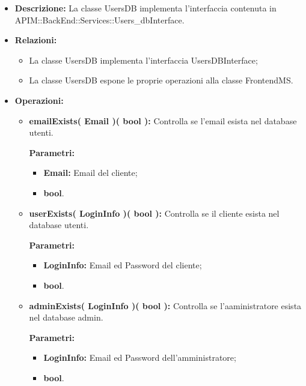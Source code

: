\begin{itemize}
	\item \textbf{Descrizione:} La classe UsersDB implementa l'interfaccia contenuta in APIM::BackEnd::Services::Users\_dbInterface.
	\item \textbf{Relazioni:}
		\begin{itemize}
			\item La classe UsersDB implementa l'interfaccia UsersDBInterface;
			\item La classe UsersDB espone le proprie operazioni alla classe FrontendMS.
		\end{itemize}
	\item \textbf{Operazioni:}
		\begin{itemize}
		
			\item \textbf{emailExists( Email )( bool ):} Controlla se l'email esista nel database utenti.
				\begin{description}
					\item[\textbf{Parametri:}]
				\end{description}
				\begin{itemize}
					\item \textbf{Email:} Email del cliente;
					\item \textbf{bool}.
				\end{itemize}
		
			\item \textbf{userExists( LoginInfo )( bool ):} Controlla se il cliente esista nel database utenti.
				\begin{description}
    				\item[\textbf{Parametri:}]
				\end{description}
				\begin{itemize}
					\item \textbf{LoginInfo:} Email ed Password del cliente;
					\item \textbf{bool}.
				\end{itemize}
			
			\item \textbf{adminExists( LoginInfo )( bool ):} Controlla se l'aaministratore esista nel database admin.
				\begin{description}
					\item[\textbf{Parametri:}]
				\end{description}
				\begin{itemize}
					\item \textbf{LoginInfo:} Email ed Password dell'amministratore;
					\item \textbf{bool}.
				\end{itemize}


\end{itemize}
\end{itemize}
